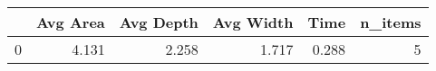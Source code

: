 \begin{tabular}{lrrrrr}
\toprule
{} &  Avg Area &  Avg Depth &  Avg Width &   Time &  n\_items \\
\midrule
0 &     4.131 &      2.258 &      1.717 &  0.288 &        5 \\
\bottomrule
\end{tabular}
